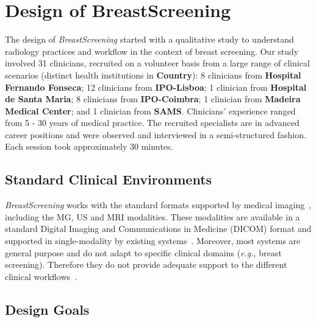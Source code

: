 \section{Design of BreastScreening}
\label{sec:sec003}

The design of {\it BreastScreening} started with a qualitative study to understand radiology practices and workflow in the context of breast screening.
Our study involved 31 clinicians, recruited on a volunteer basis from a large range of clinical scenarios (distinct health institutions in \textbf{Country}):
8 clinicians from \textbf{Hospital Fernando Fonseca}; %
12 clinicians from \textbf{IPO-Lisboa}; %
1 clinician from \textbf{Hospital de Santa Maria}; %
8 clinicians from \textbf{IPO-Coimbra}; %
1 clinician from \textbf{Madeira Medical Center}; and %
1 clinician from \textbf{SAMS}. %
Clinicians' experience ranged from 5 - 30 years of medical practice.
The recruited specialists are in advanced career positions and were observed and interviewed in a semi-structured fashion.
Each session took approximately 30 minutes.

\subsection{Standard Clinical Environments}

{\it BreastScreening} works with the standard formats supported by medical imaging~\cite{ng2017technical}, including the MG, US and MRI modalities.
These modalities are available in a standard  Digital Imaging and Communications in Medicine (DICOM) format and supported in single-modality by existing systems~\cite{henriksen2018efficacy}. Moreover, most systems are general purpose and do not adapt to specific clinical domains ({\it e.g.}, breast screening). Therefore they do not provide adequate support to the different clinical workflows~\cite{Calisto:2017:TTM:3132272.3134111}.

\subsection{Design Goals}


